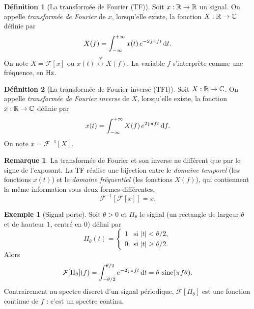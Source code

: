 \documentclass[a4paper,11pt]{article}
\theoremstyle{definition}
\newtheorem{definition}{Définition}[section]
\newtheorem{exemple}{Exemple}[section]
\newtheorem{remark}{Remarque}[section]
\newcommand{\highlight}[1]{{\color{niceblue}\emph{#1}}}
\newcommand{\tf}{\overset{\mathcal F}{\longleftrightarrow}}
\begin{document}
\begin{definition}[La transformée de Fourier (TF)]
    \label{def:tf}
    Soit $x:{\mathbb{R}}\to{\mathbb{R}}$ un signal. On appelle \highlight{transformée de Fourier} de $x$, lorsqu'elle existe, la fonction $X:{\mathbb{R}}\to{\mathbb{C}}$ définie par
    $$
        X(f) = \int_{-\infty}^{+\infty} x(t)\,e^{-2\operatorname{\mathsf{j}}\pi ft}\,{\rm d} t.
    $$
    On note $X=\mathcal F[x]$ ou $x(t)\tf X(f)$. La variable $f$ s'interprète comme une fréquence, en ${\mbox{Hz}}$.
\end{definition}

\begin{definition}[La transformée de Fourier inverse (TFI)]
    \label{def:tfi}
    Soit $X:{\mathbb{R}}\to{\mathbb{C}}$. On appelle \highlight{transformée de Fourier inverse} de $X$, lorsqu'elle existe, la fonction $x:{\mathbb{R}}\to{\mathbb{C}}$ définie par
    $$
        x(t) = \int_{-\infty}^{+\infty} X(f)\,e^{2\operatorname{\mathsf{j}}\pi ft}\,{\rm d} f.
    $$
    On note $x=\mathcal F^{-1}[X]$.
\end{definition}

\begin{remark}
    La transformée de Fourier et son inverse ne diffèrent que par le signe de l'exposant. La TF réalise une bijection entre le \highlight{domaine temporel} (les fonctions $x(t)$) et le \highlight{domaine fréquentiel} (les fonctions $X(f)$), qui contiennent la même information sous deux formes différentes,
    $$\mathcal F^{-1}[\mathcal F[x]] = x.$$ 
\end{remark}


\begin{exemple}[Signal porte]
    \label{ex:porte}
    Soit $\theta>0$ et $\Pi_\theta$ le signal (un rectangle de largeur $\theta$ et de hauteur $1$, centré en $0$) défini par
    $$
        \Pi_\theta(t) = \begin{cases} 1 & \text{si } |t| < \theta/2, \\ 0 & \text{si } |t| \geq \theta/2. \end{cases}
    $$
    Alors
    $$
        \mathcal F[\Pi_\theta](f) = \int_{-\theta/2}^{\theta/2} e^{-2\operatorname{\mathsf{j}}\pi ft}\,{\rm d} t = \theta\,\operatorname{sinc}(\pi f\theta).
    $$
    Contrairement au spectre discret d'un signal périodique, $\mathcal F[\Pi_\theta]$ est une fonction continue de $f$ : c'est un spectre continu.
\end{exemple}
\end{document}
